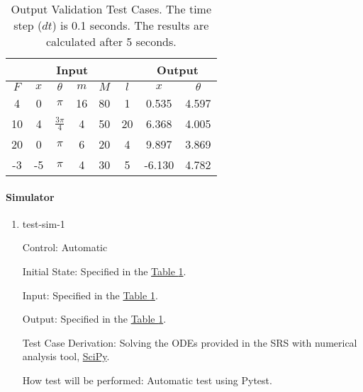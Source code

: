 \documentclass[12pt, titlepage]{article}
\begin{document}
\begin{table}[ht]
\centering
\caption{
  Output Validation Test Cases. The time step ($dt$) is 0.1 seconds.
  The results are calculated after 5 seconds.
} \label{table:input_output}
\vspace*{2mm}
 \begin{tabular}{|c c c c c c|c c|} 
 \hline
 \multicolumn{6}{|c|}{Input} & \multicolumn{2}{c|}{Output}\\ \hline 
  $F$ & $x$ & $\theta$         & $m$ & $M$ & $l$ & $x$    & $\theta$ \\ \hline
  4   & 0   & $\pi$            & 16  & 80  &  1  & 0.535  & 4.597    \\ \hline
  10  & 4   & $\frac{3\pi}{4}$ & 4   & 50  &  20 & 6.368  & 4.005    \\ \hline
  20  & 0   & $\pi$            & 6   & 20  &  4  & 9.897  & 3.869    \\ \hline
  -3  & -5  & $\pi$            & 4   & 30  &  5  & -6.130 & 4.782    \\ \hline
\end{tabular}

\end{table}

		
\paragraph{Simulator}

\begin{enumerate}

\item{test-sim-1\\}

Control: Automatic
					
Initial State: Specified in the \hyperref[table:input_output]{Table \ref*{table:input_output}}.
					
Input: Specified in the \hyperref[table:input_output]{Table \ref*{table:input_output}}.
					
Output: Specified in the \hyperref[table:input_output]{Table \ref*{table:input_output}}.

Test Case Derivation: Solving the ODEs provided in the SRS with numerical analysis tool,
\href{https://scipy.org/}{SciPy}.
					
How test will be performed: 
Automatic test using Pytest.

\end{enumerate}
\end{document}
